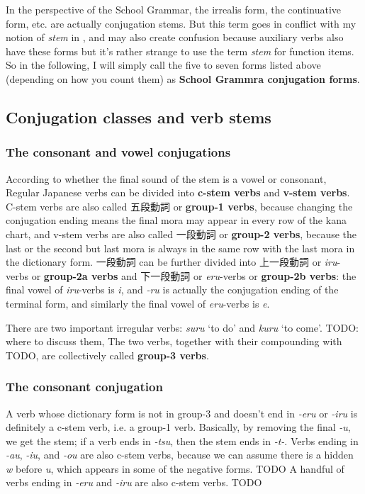 \documentclass[UTF8, a4paper, oneside, scheme=plain]{ctexart}
\newcommand*{\concept}[1]{\textbf{#1}}
\newcommand*{\term}[1]{\emph{#1}}
\newcommand{\corpus}[1]{\emph{#1}}
\newcommand{\translate}[1]{`#1'}
\begin{document}
In the perspective of the School Grammar, the irrealis form, the continuative form, etc. 
are actually conjugation stems.
But this term goes in conflict with my notion of \term{stem} in ,
and may also create confusion because auxiliary verbs also have these forms 
but it's rather strange to use the term \term{stem} for function items.
So in the following,
I will simply call the five to seven forms listed above (depending on how you count them)
as \concept{School Grammra conjugation forms}.

\subsection{Conjugation classes and verb stems}\label{sec:conjugation-class}

\subsubsection{The consonant and vowel conjugations}

According to whether the final sound of the stem is a vowel or consonant,
Regular Japanese verbs can be divided into \concept{c-stem verbs} and \concept{v-stem verbs}.
C-stem verbs are also called 五段動詞 or \concept{group-1 verbs},
because changing the conjugation ending means the final mora may appear in every row of the kana chart, 
and v-stem verbs are also called 一段動詞 or \concept{group-2 verbs},
because the last or the second but last mora is always in the same row with the last mora in the dictionary form.
一段動詞 can be further divided into 上一段動詞 or \corpus{iru}-verbs or \concept{group-2a verbs} 
and 下一段動詞 or \corpus{eru}-verbs or \concept{group-2b verbs}:
the final vowel of \corpus{iru}-verbs is \corpus{i},
and \corpus{-ru} is actually the conjugation ending of the terminal form,
and similarly the final vowel of \corpus{eru}-verbs is \corpus{e}.

There are two important irregular verbs: \corpus{suru} \translate{to do} and \corpus{kuru} \translate{to come}.
TODO: where to discuss them, 
The two verbs, together with their compounding with TODO,
are collectively called \concept{group-3 verbs}.

\subsubsection{The consonant conjugation}\label{sec:consonant-class}

A verb whose dictionary form is not in group-3 and doesn't end in \corpus{-eru} or \corpus{-iru} 
is definitely a c-stem verb, i.e. a group-1 verb.
Basically, by removing the final \corpus{-u}, we get the stem;
if a verb ends in \corpus{-tsu},
then the stem ends in \corpus{-t-}.
Verbs ending in \corpus{-au}, \corpus{-iu}, and \corpus{-ou} are also c-stem verbs,
because we can assume there is a hidden \corpus{w} before \corpus{u},
which appears in some of the negative forms. TODO
A handful of verbs ending in \corpus{-eru} and \corpus{-iru} are also c-stem verbs. TODO
\end{document}
